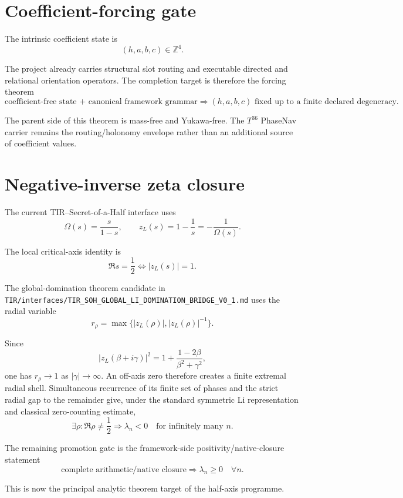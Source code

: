 \section{Coefficient-forcing gate}
\label{sec:phasenav_noema_dependency_boundary}

The intrinsic coefficient state is
\[
(h,a,b,c)\in\mathbb Z^4.
\]

The project already carries structural slot routing and executable directed and
relational orientation operators.  The completion target is therefore the
forcing theorem
\[
\boxed{
\text{coefficient-free state + canonical framework grammar}
\Longrightarrow
(h,a,b,c)\text{ fixed up to a finite declared degeneracy}.
}
\]

The parent side of this theorem is mass-free and Yukawa-free.  The
$T^{36}$ PhaseNav carrier remains the routing/holonomy envelope rather than an
additional source of coefficient values.

\section{Negative-inverse zeta closure}

The current TIR--Secret-of-a-Half interface uses
\[
\Omega(s)=\frac{s}{1-s},
\qquad
z_L(s)=1-\frac1s=-\frac1{\Omega(s)}.
\]

The local critical-axis identity is
\[
\Re s=\frac12
\iff |z_L(s)|=1.
\]

The global-domination theorem candidate in
\texttt{TIR/interfaces/TIR\_SOH\_GLOBAL\_LI\_DOMINATION\_BRIDGE\_V0\_1.md}
uses the radial variable
\[
r_\rho=\max\{|z_L(\rho)|,|z_L(\rho)|^{-1}\}.
\]

Since
\[
|z_L(\beta+i\gamma)|^2
=1+\frac{1-2\beta}{\beta^2+\gamma^2},
\]
one has $r_\rho\to1$ as $|\gamma|\to\infty$.  An off-axis zero therefore
creates a finite extremal radial shell.  Simultaneous recurrence of its finite
set of phases and the strict radial gap to the remainder give, under the
standard symmetric Li representation and classical zero-counting estimate,
\[
\boxed{
\exists\rho:\Re\rho\ne\frac12
\Longrightarrow
\lambda_n<0\quad\text{for infinitely many }n.
}
\]

The remaining promotion gate is the framework-side positivity/native-closure
statement
\[
\boxed{
\text{complete arithmetic/native closure}
\Longrightarrow
\lambda_n\ge0\quad\forall n.
}
\]

This is now the principal analytic theorem target of the half-axis programme.

